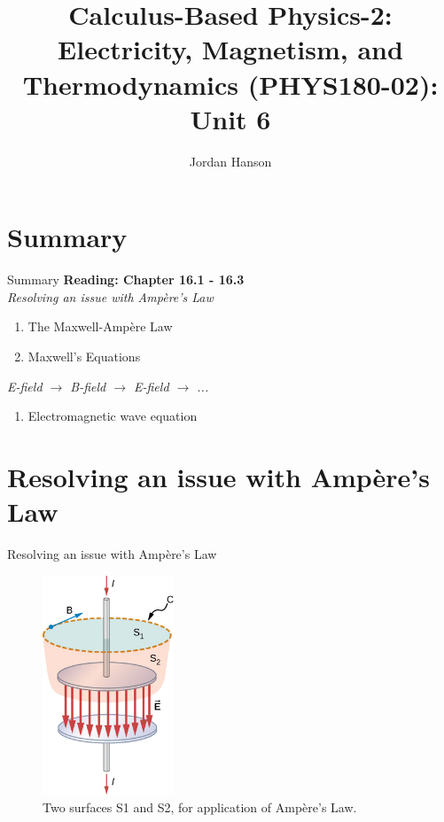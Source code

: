 \documentclass{beamer}
\title{Calculus-Based Physics-2: Electricity, Magnetism, and Thermodynamics (PHYS180-02): Unit 6}
\author{Jordan Hanson}
\institute{Whittier College Department of Physics and Astronomy}
\begin{document}
\maketitle

\section{Summary}

\begin{frame}{Summary}
\textbf{Reading: Chapter 16.1 - 16.3} \\ \vspace{0.5cm}
\textit{Resolving an issue with Amp\`{e}re's Law}
\begin{enumerate}
\item The Maxwell-Amp\`{e}re Law
\item Maxwell's Equations
\end{enumerate}
\textit{E-field $\rightarrow$ B-field $\rightarrow$ E-field $\rightarrow$ ...}
\begin{enumerate}
\item Electromagnetic wave equation
\end{enumerate}
\end{frame}

\section{Resolving an issue with  Amp\`{e}re's Law}

\begin{frame}{Resolving an issue with  Amp\`{e}re's Law}
\begin{figure}
\centering
\includegraphics[width=0.35\textwidth]{figures/surface.jpeg}
\caption{\label{fig:surf} Two surfaces S1 and S2, for application of Amp\`{e}re's Law.}
\end{figure}
\end{frame}
\end{document}
